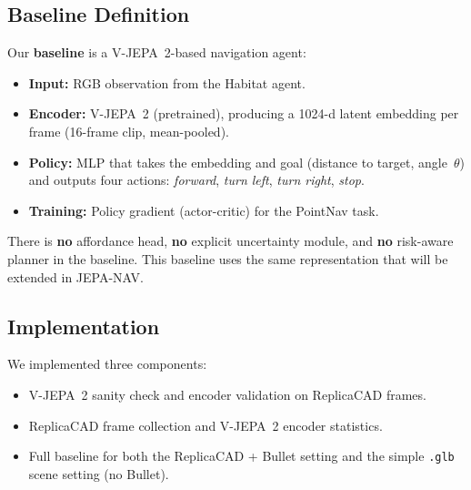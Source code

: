 \documentclass{article}
\begin{document}
\subsection{Baseline Definition}

Our \textbf{baseline} is a V-JEPA~2-based navigation agent:
\begin{itemize}
  \item \textbf{Input:} RGB observation from the Habitat agent.
  \item \textbf{Encoder:} V-JEPA~2 (pretrained), producing a 1024-d latent embedding
        per frame (16-frame clip, mean-pooled).
  \item \textbf{Policy:} MLP that takes the embedding and goal (distance to target,
        angle~$\theta$) and outputs four actions: \textit{forward}, \textit{turn left},
        \textit{turn right}, \textit{stop}.
  \item \textbf{Training:} Policy gradient (actor-critic) for the PointNav task.
\end{itemize}

\noindent
There is \textbf{no} affordance head, \textbf{no} explicit uncertainty module, and
\textbf{no} risk-aware planner in the baseline. This baseline uses the same
representation that will be extended in JEPA-NAV.




\subsection{Implementation}

We implemented three components:
\begin{itemize}
    \item[(A)] V-JEPA~2 sanity check and encoder validation on ReplicaCAD frames.
    \item[(B)] ReplicaCAD frame collection and V-JEPA~2 encoder statistics.
    \item[(C)] Full baseline for both the ReplicaCAD + Bullet setting and the simple
               \texttt{.glb} scene setting (no Bullet).
\end{itemize}
\end{document}
